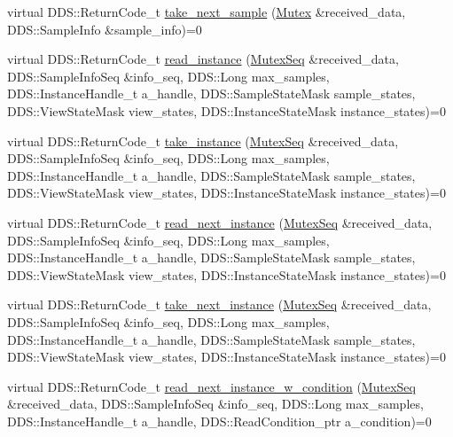 \begin{DoxyCompactItemize}
virtual DDS::ReturnCode\_\-t \hyperlink{classKnowledge_1_1MutexDataReader_a18493f33aea07e10cc53f41a6579a220}{take\_\-next\_\-sample} (\hyperlink{structKnowledge_1_1Mutex}{Mutex} \&received\_\-data, DDS::SampleInfo \&sample\_\-info)=0
\item 
virtual DDS::ReturnCode\_\-t \hyperlink{classKnowledge_1_1MutexDataReader_a74b0065deb746be5fd00b8fc2770d316}{read\_\-instance} (\hyperlink{namespaceKnowledge_a3165529aa87299c6a92754fbd7eeeff4}{MutexSeq} \&received\_\-data, DDS::SampleInfoSeq \&info\_\-seq, DDS::Long max\_\-samples, DDS::InstanceHandle\_\-t a\_\-handle, DDS::SampleStateMask sample\_\-states, DDS::ViewStateMask view\_\-states, DDS::InstanceStateMask instance\_\-states)=0
\item 
virtual DDS::ReturnCode\_\-t \hyperlink{classKnowledge_1_1MutexDataReader_a01b83885cc067cadc8d9a85f34990159}{take\_\-instance} (\hyperlink{namespaceKnowledge_a3165529aa87299c6a92754fbd7eeeff4}{MutexSeq} \&received\_\-data, DDS::SampleInfoSeq \&info\_\-seq, DDS::Long max\_\-samples, DDS::InstanceHandle\_\-t a\_\-handle, DDS::SampleStateMask sample\_\-states, DDS::ViewStateMask view\_\-states, DDS::InstanceStateMask instance\_\-states)=0
\item 
virtual DDS::ReturnCode\_\-t \hyperlink{classKnowledge_1_1MutexDataReader_a0f1ec5fa19ce1d2e870da86cd4328142}{read\_\-next\_\-instance} (\hyperlink{namespaceKnowledge_a3165529aa87299c6a92754fbd7eeeff4}{MutexSeq} \&received\_\-data, DDS::SampleInfoSeq \&info\_\-seq, DDS::Long max\_\-samples, DDS::InstanceHandle\_\-t a\_\-handle, DDS::SampleStateMask sample\_\-states, DDS::ViewStateMask view\_\-states, DDS::InstanceStateMask instance\_\-states)=0
\item 
virtual DDS::ReturnCode\_\-t \hyperlink{classKnowledge_1_1MutexDataReader_a912f721527051a6b52c8db5a04c73390}{take\_\-next\_\-instance} (\hyperlink{namespaceKnowledge_a3165529aa87299c6a92754fbd7eeeff4}{MutexSeq} \&received\_\-data, DDS::SampleInfoSeq \&info\_\-seq, DDS::Long max\_\-samples, DDS::InstanceHandle\_\-t a\_\-handle, DDS::SampleStateMask sample\_\-states, DDS::ViewStateMask view\_\-states, DDS::InstanceStateMask instance\_\-states)=0
\item 
virtual DDS::ReturnCode\_\-t \hyperlink{classKnowledge_1_1MutexDataReader_a91ac56526614c363705641d43ec41ce0}{read\_\-next\_\-instance\_\-w\_\-condition} (\hyperlink{namespaceKnowledge_a3165529aa87299c6a92754fbd7eeeff4}{MutexSeq} \&received\_\-data, DDS::SampleInfoSeq \&info\_\-seq, DDS::Long max\_\-samples, DDS::InstanceHandle\_\-t a\_\-handle, DDS::ReadCondition\_\-ptr a\_\-condition)=0

\end{DoxyCompactItemize}
